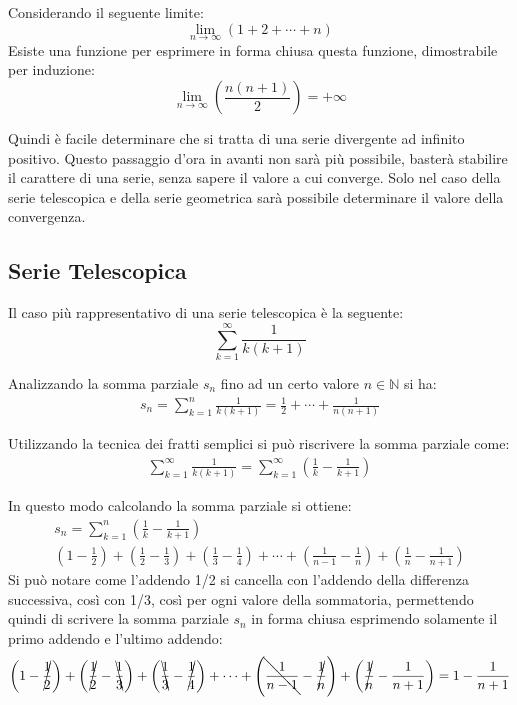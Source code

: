 \documentclass{article}
\numberwithin{equation}{subsection}
\begin{document}

Considerando il seguente limite:
\begin{equation*}
    \lim_{n\to\infty}(1+2+\cdots+n)
\end{equation*}
Esiste una funzione per esprimere in forma chiusa questa funzione, dimostrabile per induzione:
\begin{equation*}
    \lim_{n\to\infty}\left(\displaystyle\frac{n(n+1)}{2}\right)=+\infty
\end{equation*}

Quindi è facile determinare che si tratta di una serie divergente ad infinito positivo. Questo passaggio d'ora in avanti non sarà più possibile, basterà stabilire il carattere di una serie, senza sapere il valore a cui converge. Solo nel caso della serie telescopica e della serie geometrica sarà possibile determinare il valore della convergenza. 

\subsection{Serie Telescopica}

Il caso più rappresentativo di una serie telescopica è la seguente:
\begin{equation}
    \displaystyle\sum_{k=1}^\infty\frac{1}{k(k+1)}
\end{equation}

Analizzando la somma parziale $s_n$ fino ad un certo valore $n\in\mathbb{N}$ si ha:
\begin{gather*}
    s_n=\displaystyle\sum_{k=1}^n\frac{1}{k(k+1)}=\frac{1}{2}+\cdots+\frac{1}{n(n+1)}
\end{gather*} 

Utilizzando la tecnica dei fratti semplici si può riscrivere la somma parziale come:
\begin{gather*}
    \displaystyle\sum_{k=1}^\infty\frac{1}{k(k+1)}=\sum_{k=1}^\infty\left(\frac{1}{k}-\frac{1}{k+1}\right)
\end{gather*}

In questo modo calcolando la somma parziale si ottiene:
\begin{gather*}
    s_n=\displaystyle\sum_{k=1}^n\left(\frac{1}{k}-\frac{1}{k+1}\right)\\
    \left({1}-\frac{1}{2}\right)+
    \left(\frac{1}{2}-\frac{1}{3}\right)+
    \left(\frac{1}{3}-\frac{1}{4}\right)+
    \cdots+
    \left(\frac{1}{n-1}-\frac{1}{n}\right)+
    \left(\frac{1}{n}-\frac{1}{n+1}\right)
\end{gather*}
Si può notare come l'addendo 1/2 si cancella con l'addendo della differenza successiva, così con 1/3, così per ogni valore della sommatoria, permettendo quindi di scrivere la somma parziale $s_n$ in forma chiusa esprimendo solamente il primo addendo e l'ultimo addendo:
\begin{gather*}
    \left({1}-\cancel{\frac{1}{2}}\right)+
    \left(\cancel{\frac{1}{2}}-\bcancel{\frac{1}{3}}\right)+
    \left(\bcancel{\frac{1}{3}}-\cancel{\frac{1}{4}}\right)+
    \cdots+
    \left(\bcancel{\frac{1}{n-1}}-\cancel{\frac{1}{n}}\right)+
    \left(\cancel{\frac{1}{n}}-\frac{1}{n+1}\right)=
    1-\frac{1}{n+1}
\end{gather*}
\end{document}
